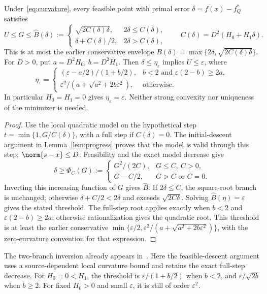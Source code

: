 \begin{lemma}\label{lem:awaybridge}
Under~\eqref{eq:curvature}, every feasible point with primal error
$\delta=f(x)-f_Q^*$ satisfies
\[
 U\le G\le\widehat B(\delta):=
 \begin{cases}
 \sqrt{2C(\delta)\delta},&2\delta\le C(\delta),\\
 \delta+C(\delta)/2,&2\delta>C(\delta),
 \end{cases}
 \qquad C(\delta)=D^2(H_0+H_1\delta).
\]
This is at most the earlier conservative envelope
$B(\delta)=\max\{2\delta,\sqrt{2C(\delta)\delta}\}$.
For $D>0$, put $a=D^2H_0$, $b=D^2H_1$.
Then $\delta\le\eta_\varepsilon$ implies $U\le\varepsilon$, where
\[
 \eta_\varepsilon=
 \begin{cases}
 (\varepsilon-a/2)/(1+b/2),& b<2\text{ and }\varepsilon(2-b)\ge2a,\\[2pt]
 \varepsilon^2/(a+\sqrt{a^2+2b\varepsilon^2}),&\text{otherwise}.
 \end{cases}
\]
In particular $H_0=H_1=0$ gives $\eta_\varepsilon=\varepsilon$.
Neither strong convexity nor uniqueness of the minimizer is needed.
\end{lemma}
\begin{proof}
Use the local quadratic model on the hypothetical step
$t=\min\{1,G/C(\delta)\}$, with a full step if $C(\delta)=0$.
The initial-descent argument in Lemma~\ref{lem:progress} proves that
the model is valid through this step; $\norm{s-x}\le D$.
Feasibility and the exact model decrease give
\[
 \delta\ge\Phi_C(G):=
 \begin{cases}G^2/(2C),&G\le C,\ C>0,\\
 G-C/2,&G>C\text{ or }C=0.
 \end{cases}
\]
Inverting this increasing function of $G$ gives $\widehat B$.
If $2\delta\le C$, the square-root branch is unchanged; otherwise
$\delta+C/2<2\delta$ and exceeds $\sqrt{2C\delta}$.
Solving $\widehat B(\eta)=\varepsilon$ gives the stated threshold.
The full-step root applies exactly when $b<2$ and
$\varepsilon(2-b)\ge2a$; otherwise rationalization gives the
quadratic root. This threshold is at least the earlier conservative
$\min\{\varepsilon/2,\varepsilon^2/(a+\sqrt{a^2+2b\varepsilon^2})\}$,
with the zero-curvature convention for that expression.
\end{proof}
The two-branch inversion already appears in~\cite[Eq.~(15)]{lacoste2016}.
Here the feasible-descent argument uses a source-dependent local
curvature bound and retains the exact full-step decrease.
For $H_0=0<H_1$, the threshold is
$\varepsilon/(1+b/2)$ when $b<2$, and
$\varepsilon/\sqrt{2b}$ when $b\ge2$. For fixed $H_0>0$ and small
$\varepsilon$, it is still of order $\varepsilon^2$.

